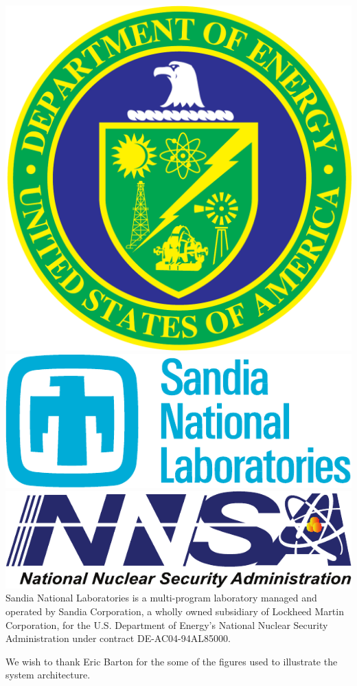 \documentclass[conference]{IEEEtran}
\begin{document}
\includegraphics[scale=0.07]{logos/doe_logo}
\includegraphics[scale=0.30]{logos/snl_logo}
\includegraphics[scale=0.35]{logos/nnsa_logo}
Sandia National Laboratories is a multi-program laboratory managed and operated
by Sandia Corporation, a wholly owned subsidiary of Lockheed Martin
Corporation, for the U.S. Department of Energy's National Nuclear Security
Administration under contract DE-AC04-94AL85000.

We wish to thank Eric Barton for the some of the figures used to illustrate
the system architecture.




\vfill\eject
\end{document}
